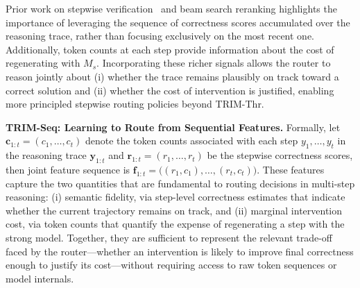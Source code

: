 \documentclass{article}
\theoremstyle{plain}
\theoremstyle{definition}
\theoremstyle{remark}
\begin{document}
Prior work on stepwise verification~\citep{prm800k,mathshephard} and beam search reranking highlights the importance of leveraging the sequence of correctness scores accumulated over the reasoning trace, rather than focusing exclusively on the most recent one. Additionally, token counts at each step provide information about the cost of regenerating with $M_s$. Incorporating these richer signals allows the router to reason jointly about (i) whether the trace remains plausibly on track toward a correct solution and (ii) whether the cost of intervention is justified, enabling more principled stepwise routing policies beyond TRIM-Thr.

\textbf{TRIM-Seq: Learning to Route from Sequential Features.}
Formally, let $\mathbf{c}_{1:t} = (c_1, \ldots, c_t)$ denote the token counts associated with each step $y_1, \ldots, y_t$ in the reasoning trace $\mathbf{y}_{1:t}$ and $\mathbf{r}_{1:t} = (r_1, \ldots, r_t)$ be the stepwise correctness scores, then joint feature sequence is
$
\mathbf{f}_{1:t} = \big((r_1, c_1), \ldots, (r_t, c_t)\big).
$
These features capture the two quantities that are fundamental to routing decisions in multi-step reasoning: (i) semantic fidelity, via step-level correctness estimates that indicate whether the current trajectory remains on track, and (ii) marginal intervention cost, via token counts that quantify the expense of regenerating a step with the strong model. Together, they are sufficient to represent the relevant trade-off faced by the router—whether an intervention is likely to improve final correctness enough to justify its cost—without requiring access to raw token sequences or model internals. 
\end{document}
